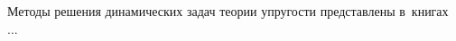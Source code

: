 \vspace{8mm}
\hfill\begin{minipage}[b]{0.95\linewidth}
\fontsize{10}{12}\selectfont

\section*{\wordforbibliography}

\begin{otherlanguage}{russian}

Методы решения динамических задач теории упругости представлены в~книгах ...

\end{otherlanguage}

\end{minipage}
